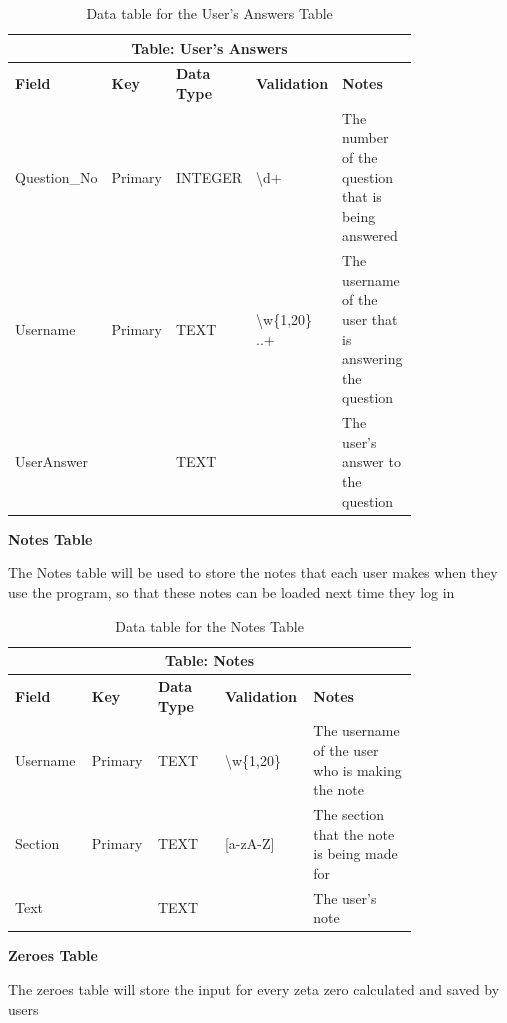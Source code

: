 \documentclass[12pt]{article}
\begin{document}
\begin{table}[ht]
    \centering
    \begin{tabular}{ | p{0.15\linewidth} | p{0.1\linewidth} | p{0.16\linewidth} | p{0.14\linewidth} | p{0.25\linewidth} | }
    \hline
    \multicolumn{5}{|c|}{\textbf{Table: User's Answers}}\\
    \hline
    \hline
    \textbf{Field} & \textbf{Key} & \textbf{Data Type} & \textbf{Validation} & \textbf{Notes} \\
    \hline
    Question\_No & Primary & INTEGER & \textbackslash d+ & The number of the question that is being answered\\
    \hline
    Username & Primary & TEXT & \textbackslash w\{1,20\} ..+ & The username of the user that is answering the question\\
    \hline
    UserAnswer & & TEXT & & The user's answer to the question\\
    \hline
    \end{tabular}
    \caption{Data table for the User's Answers Table}
\end{table}

\clearpage
\textbf{Notes Table}

The Notes table will be used to store the notes that each user makes when they use the program, so that these notes can be loaded next time they log in

\begin{table}[ht]
    \centering
    \begin{tabular}{ | p{0.15\linewidth} | p{0.1\linewidth} | p{0.16\linewidth} | p{0.14\linewidth} | p{0.25\linewidth} | }
    \hline
    \multicolumn{5}{|c|}{\textbf{Table: Notes}}\\
    \hline
    \hline
    \textbf{Field} & \textbf{Key} & \textbf{Data Type} & \textbf{Validation} & \textbf{Notes} \\
    \hline
    Username & Primary & TEXT & \textbackslash w\{1,20\} & The username of the user who is making the note\\
    \hline
    Section & Primary & TEXT & [a-zA-Z] & The section that the note is being made for\\
    \hline
    Text & & TEXT & & The user's note\\
    \hline
    \end{tabular}
    \caption{Data table for the Notes Table}
\end{table}

\textbf{Zeroes Table}

The zeroes table will store the input for every zeta zero calculated and saved by users
\end{document}
